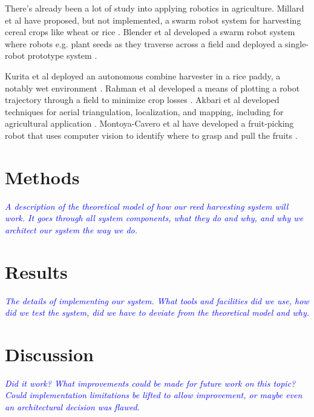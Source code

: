 \documentclass[12pt,american,german,british]{article}
\newcommand{\reedtemp}[1] {
	\textit{\textcolor{blue}{#1}}
}
\begin{document}
There's already been a lot of study into applying robotics in agriculture.
Millard et al have proposed, but not implemented, a swarm robot system for
harvesting cereal crops like wheat or rice \cite{Millard2019}.  Blender et al
developed a swarm robot system where robots e.g. plant seeds as they traverse
across a field and deployed a single-robot prototype system \cite{Blender2016}.

Kurita et al deployed an autonomous combine harvester in a rice paddy, a
notably wet environment \cite{Kurita2017}.  Rahman et al developed a means of
plotting a robot trajectory through a field to minimize crop losses
\cite{Rahman2019}.  Akbari et al developed techniques for aerial triangulation,
localization, and mapping, including for agricultural application
\cite{Akbari2021}.  Montoya-Cavero et al have developed a fruit-picking robot
that uses computer vision to identify where to grasp and pull the fruits
\cite{MontoyaCavero2022}.

\section{Methods}

\reedtemp{
A description of the theoretical model of how our reed harvesting system will
work.  It goes through all system components, what they do and why, and why
we architect our system the way we do.
}

\section{Results}

\reedtemp{
The details of implementing our system.  What tools and facilities did we use,
how did we test the system, did we have to deviate from the theoretical model
and why.
}

\section{Discussion}

\reedtemp{
Did it work?  What improvements could be made for future work on this topic?
Could implementation limitations be lifted to allow improvement, or maybe even
an architectural decision was flawed.
}



\end{document}

